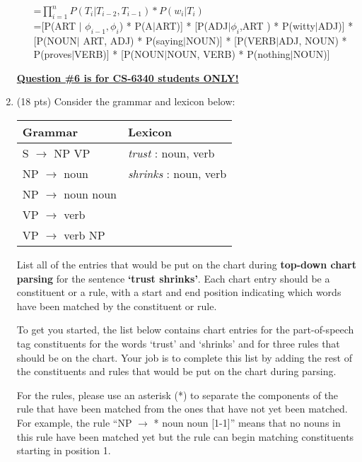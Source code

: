 \documentclass[11pt]{article}
\begin{document}
\begin{enumerate}
\begin{enumerate}
=$\prod\limits_{i=1}^{n} P(T_i | T_{i-2},T_{i-1}) * P(w_i |T_i)$\\

=[P(ART $|$ $\phi_{i-1} , \phi_i$) * P(A$|$ART)] * [P(ADJ$|\phi_i$,ART ) * P(witty$|$ADJ)] *[P(NOUN$|$ ART, ADJ) * P(saying$|$NOUN)] * [P(VERB$|$ADJ, NOUN) * P(proves$|$VERB)] * [P(NOUN$|$NOUN, VERB) * P(nothing$|$NOUN)]  
\end{enumerate}

\underline{\textbf{Question \#6 is for CS-6340 students ONLY!}}  \\


\item (18 pts) Consider the grammar and lexicon below:

\begin{center}
\begin{tabular}{|ll|} \hline
\textbf{Grammar} & \textbf{Lexicon} \\  \hline
S $\rightarrow$ NP VP & {\it trust} : noun, verb \\
NP $\rightarrow$ noun & {\it shrinks} :  noun, verb \\
NP $\rightarrow$ noun noun  & ~ \\
VP $\rightarrow$ verb & ~ \\
VP $\rightarrow$ verb NP & ~ \\  \hline
\end{tabular}
\end{center}

\vspace*{.1in} List all of the entries that would be put on the chart during
{\bf top-down chart parsing} for the sentence {\bf `trust shrinks'}.
Each chart entry should be a constituent or a rule, with a start
and end position indicating which words have been matched by the
constituent or rule.

To get you started, the list below contains chart entries for the
part-of-speech tag constituents for the words `trust' and `shrinks'
and for three rules that should be on the chart. Your job is to complete
this list by adding the rest of the constituents and rules that would
be put on the chart during parsing.

For the rules, please use an asterisk (*) to separate the components
of the rule that have been matched from the ones that have not yet been
matched. For example, the rule ``NP $\rightarrow$ * noun noun [1-1]'' means that
no nouns in this rule have been matched yet but the rule
can begin matching constituents starting in position 1. \\ 


\end{enumerate}
\end{document}
